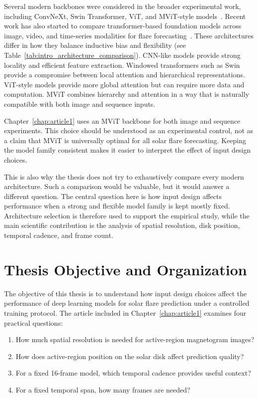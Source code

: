Several modern backbones were considered in the broader experimental work, including ConvNeXt, Swin Transformer, ViT, and MViT-style models~\cite{ref_vit,ref_mvit,ref_swin,ref_convnext}. Recent work has also started to compare transformer-based foundation models across image, video, and time-series modalities for flare forecasting~\cite{ref_riggi_transformers}. These architectures differ in how they balance inductive bias and flexibility (see Table~\ref{tab:intro_architecture_comparison}). CNN-like models provide strong locality and efficient feature extraction. Windowed transformers such as Swin provide a compromise between local attention and hierarchical representations. ViT-style models provide more global attention but can require more data and computation. MViT combines hierarchy and attention in a way that is naturally compatible with both image and sequence inputs.

Chapter~\ref{chap:article1} uses an MViT backbone for both image and sequence experiments. This choice should be understood as an experimental control, not as a claim that MViT is universally optimal for all solar flare forecasting. Keeping the model family consistent makes it easier to interpret the effect of input design choices.

This is also why the thesis does not try to exhaustively compare every modern architecture. Such a comparison would be valuable, but it would answer a different question. The central question here is how input design affects performance when a strong and flexible model family is kept mostly fixed. Architecture selection is therefore used to support the empirical study, while the main scientific contribution is the analysis of spatial resolution, disk position, temporal cadence, and frame count.

\section{Thesis Objective and Organization}

The objective of this thesis is to understand how input design choices affect the performance of deep learning models for solar flare prediction under a controlled training protocol. The article included in Chapter~\ref{chap:article1} examines four practical questions:

\begin{enumerate}
  \item How much spatial resolution is needed for active-region magnetogram images?
  \item How does active-region position on the solar disk affect prediction quality?
  \item For a fixed 16-frame model, which temporal cadence provides useful context?
  \item For a fixed temporal span, how many frames are needed?
\end{enumerate}

